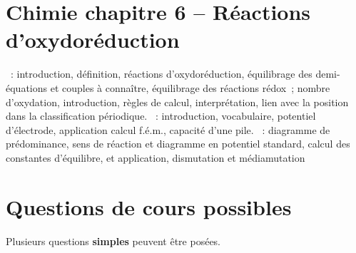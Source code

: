 \documentclass[a4paper, 12pt, final, garamond]{book}
\begin{document}
\section*{Chimie chapitre 6 -- Réactions d'oxydoréduction}
\begin{enumerate}[label=\Roman*]
    ~: introduction, définition, réactions
        d'oxydoréduction, équilibrage des demi-équations et couples à connaître,
        équilibrage des réactions rédox~; nombre d'oxydation, introduction,
        règles de calcul, interprétation, lien avec la position dans la
        classification périodique.
    ~: introduction, vocabulaire, potentiel d'électrode, application
        calcul f.é.m., capacité d'une pile.
    ~: diagramme de prédominance, sens de
        réaction et diagramme en potentiel standard, calcul des constantes
        d'équilibre, et application, dismutation et médiamutation
\end{enumerate}

\section{Questions de cours possibles}
\begin{center}
    \begin{framed}
        Plusieurs questions \textbf{simples} peuvent être posées.
    \end{framed}
\end{center}
\end{document}
